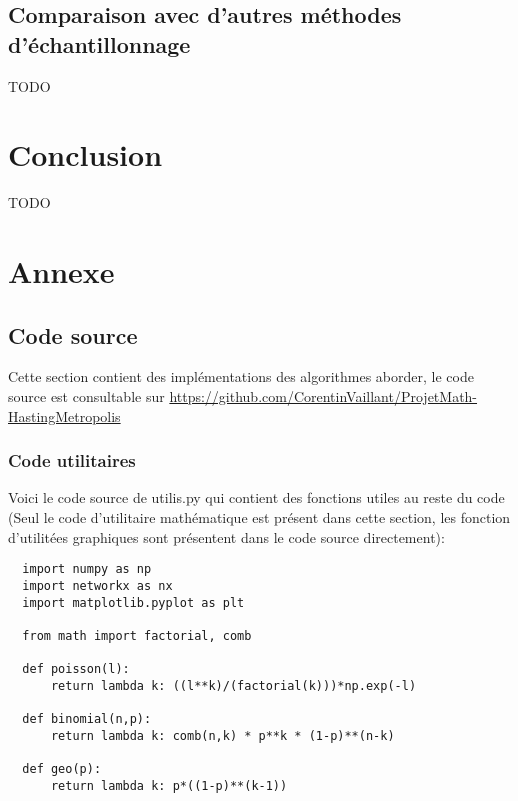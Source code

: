 \documentclass{article}
\begin{document}

\subsection{Comparaison avec d'autres méthodes d'échantillonnage}

TODO \\

\newpage
\section{Conclusion}

TODO \\

\newpage
\section{Annexe}

\subsection{Code source}

Cette section contient des implémentations des algorithmes aborder, le code source est consultable sur \url{https://github.com/CorentinVaillant/ProjetMath-HastingMetropolis}

\subsubsection{Code utilitaires}

Voici le code source de utilis.py qui contient des fonctions utiles au reste du code (Seul le code d'utilitaire mathématique est présent dans cette section, les fonction d'utilitées graphiques sont présentent dans le code source directement):

\begin{verbatim}
  import numpy as np
  import networkx as nx
  import matplotlib.pyplot as plt
  
  from math import factorial, comb
  
  def poisson(l):
      return lambda k: ((l**k)/(factorial(k)))*np.exp(-l)
  
  def binomial(n,p):
      return lambda k: comb(n,k) * p**k * (1-p)**(n-k)
  
  def geo(p):
      return lambda k: p*((1-p)**(k-1))

  
\end{verbatim}
\end{document}
